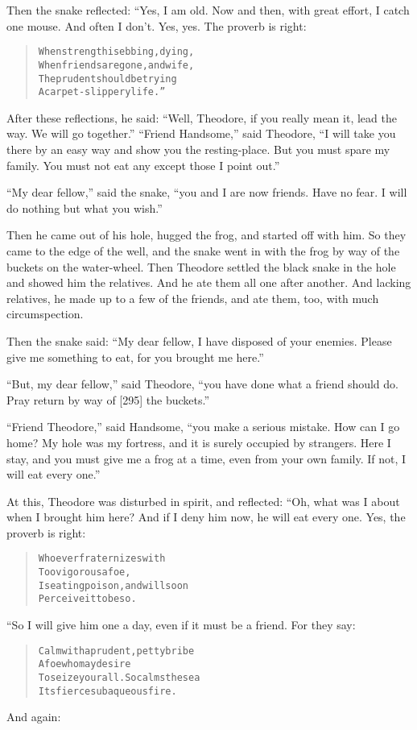 \documentclass[article, twoside, 14pt]{memoir}
\renewenvironment{verbatim}{%
\begin{quote}%
\vskip -10pt%
\begin{alltt}\normalfont\large}{\end{alltt}%
\end{quote}%
\vskip -10pt
} %
\begin{document}
Then the snake reflected: “Yes, I am old. Now and then, with great
effort, I catch one mouse. And often I don't. Yes, yes. The proverb
is right:

\begin{verbatim}
When strength is ebbing, dying,
    When friends are gone, and wife,
The prudent should be trying
    A carpet-slippery life.”
\end{verbatim}
After these reflections, he said:
``Well, Theodore, if you really mean it, lead the way. We will go together.''
``Friend Handsome,'' said Theodore,
``I will take you there by an easy way and show you the resting-place. But you must spare my family. You must not eat any except those I point out.''

``My dear fellow,'' said the snake,
``you and I are now friends. Have no fear. I will do nothing but what you wish.''

Then he came out of his hole, hugged the frog, and started off with
him. So they came to the edge of the well, and the snake went in
with the frog by way of the buckets on the water-wheel. Then
Theodore settled the black snake in the hole and showed him the
relatives. And he ate them all one after another. And lacking
relatives, he made up to a few of the friends, and ate them, too,
with much circumspection.

Then the snake said:
``My dear fellow, I have disposed of your enemies. Please give me something to eat, for you brought me here.''

``But, my dear fellow,'' said Theodore,
``you have done what a friend should do. Pray return by way of [295] the buckets.''

``Friend Theodore,'' said Handsome,
``you make a serious mistake. How can I go home? My hole was my fortress, and it is surely occupied by strangers. Here I stay, and you must give me a frog at a time, even from your own family. If not, I will eat every one.''

At this, Theodore was disturbed in spirit, and reflected: “Oh, what
was I about when I brought him here? And if I deny him now, he will
eat every one. Yes, the proverb is right:

\begin{verbatim}
Whoever fraternizes with
    Too vigorous a foe,
Is eating poison, and will soon
    Perceive it to be so.
\end{verbatim}
“So I will give him one a day, even if it must be a friend. For
they say:

\begin{verbatim}
Calm with a prudent, petty bribe
    A foe who may desire
To seize your all. So calms the sea
    Its fierce subaqueous fire.
\end{verbatim}
And again:
\end{document}
